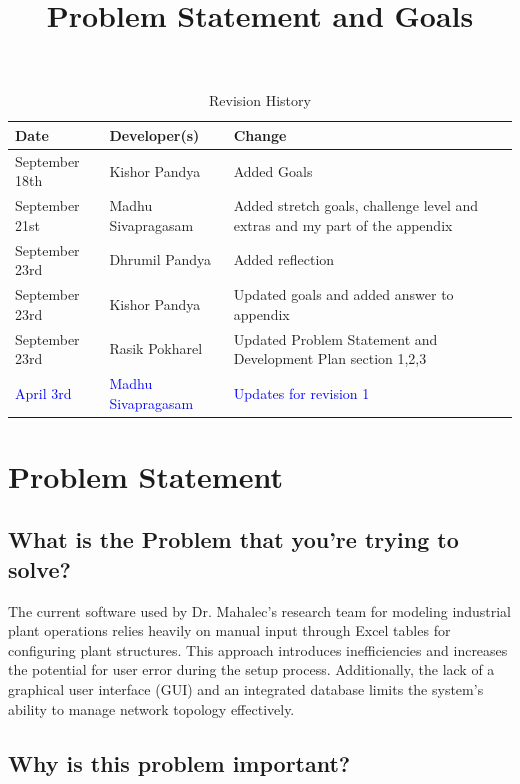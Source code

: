 \documentclass{article}
\title{Problem Statement and Goals\\\progname}
\author{\authname}
\date{}
\begin{document}
\maketitle

\begin{table}[hp]
\caption{Revision History} \label{TblRevisionHistory}
\begin{tabularx}{\textwidth}{llX}
\toprule
\textbf{Date} & \textbf{Developer(s)} & \textbf{Change}\\
\midrule
September 18th & Kishor Pandya & Added Goals\\
September 21st & Madhu Sivapragasam & Added stretch goals, challenge level and extras and my part of the appendix\\
September 23rd & Dhrumil Pandya & Added reflection\\
September 23rd & Kishor Pandya & Updated goals and added answer to appendix\\
September 23rd & Rasik Pokharel & Updated Problem Statement and Development Plan section 1,2,3\\
\textcolor{blue}{April 3rd} & \textcolor{blue}{Madhu Sivapragasam} & \textcolor{blue}{Updates for revision 1}\\
\bottomrule
\end{tabularx}
\end{table}

\section{Problem Statement}







\subsection{What is the Problem that you're trying to solve?}

The current software used by Dr. Mahalec's research team for modeling industrial plant operations relies heavily on manual input through Excel tables for configuring plant structures. This approach introduces inefficiencies and increases the potential for user error during the setup process. Additionally, the lack of a graphical user interface (GUI) and an integrated database limits the system's ability to manage network topology effectively. 
\subsection{Why is this problem important?}
\end{document}
